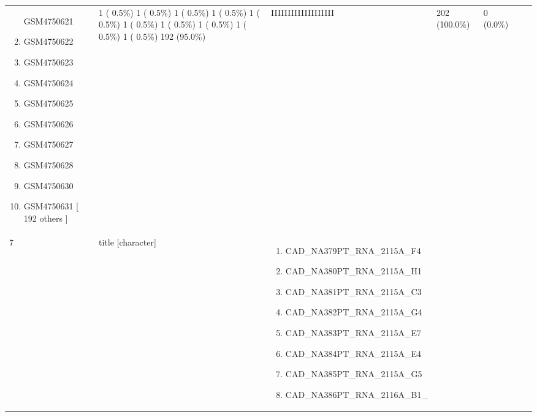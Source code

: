\documentclass[
]{article}
\providecommand{\tightlist}{%
  \setlength{\itemsep}{0pt}\setlength{\parskip}{0pt}}
\begin{document}
\begin{longtable}[]{@{}lllllll@{}}
\begin{minipage}[t]{0.20\columnwidth}
\begin{enumerate}
  GSM4750621
\item
  GSM4750622
\item
  GSM4750623
\item
  GSM4750624
\item
  GSM4750625
\item
  GSM4750626
\item
  GSM4750627
\item
  GSM4750628
\item
  GSM4750630
\item
  GSM4750631
  {[} 192 others {]}
\end{enumerate}\strut
\end{minipage} & \begin{minipage}[t]{0.14\columnwidth}\raggedright
1 ( 0.5\%)
1 ( 0.5\%)
1 ( 0.5\%)
1 ( 0.5\%)
1 ( 0.5\%)
1 ( 0.5\%)
1 ( 0.5\%)
1 ( 0.5\%)
1 ( 0.5\%)
1 ( 0.5\%)
192 (95.0\%)\strut
\end{minipage} & \begin{minipage}[t]{0.14\columnwidth}\raggedright
IIIIIIIIIIIIIIIIIII\strut
\end{minipage} & \begin{minipage}[t]{0.07\columnwidth}\raggedright
202
(100.0\%)\strut
\end{minipage} & \begin{minipage}[t]{0.07\columnwidth}\raggedright
0
(0.0\%)\strut
\end{minipage}\tabularnewline
\begin{minipage}[t]{0.03\columnwidth}\raggedright
7\strut
\end{minipage} & \begin{minipage}[t]{0.16\columnwidth}\raggedright
title
{[}character{]}\strut
\end{minipage} & \begin{minipage}[t]{0.20\columnwidth}\raggedright
\begin{enumerate}
\def\labelenumi{\arabic{enumi}.}
\tightlist
\item
  CAD\_NA379PT\_RNA\_2115A\_F4
\item
  CAD\_NA380PT\_RNA\_2115A\_H1
\item
  CAD\_NA381PT\_RNA\_2115A\_C3
\item
  CAD\_NA382PT\_RNA\_2115A\_G4
\item
  CAD\_NA383PT\_RNA\_2115A\_E7
\item
  CAD\_NA384PT\_RNA\_2115A\_E4
\item
  CAD\_NA385PT\_RNA\_2115A\_G5
\item
  CAD\_NA386PT\_RNA\_2116A\_B1\_

\end{enumerate}
\end{minipage}
\end{longtable}
\end{document}
